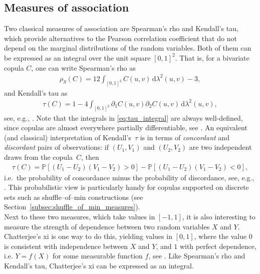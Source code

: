 \documentclass{article}
\theoremstyle{definition}
\newcommand{\Prob}{\mathbb{P}}  %
\newcommand{\de}{\mathrm{\,d}}
\begin{document}
\subsection{Measures of association}
\label{subsec:measures_of_association}

Two classical measures of association are Spearman's rho and Kendall's tau, which provide alternatives to the Pearson correlation coefficient that do not depend on the marginal distributions of the random variables.
Both of them can be expressed as an integral over the unit square $[0,1]^2$.
That is, for a bivariate copula $C$, one can write Spearman's rho as
\begin{align}\label{eq:rho_integral}
    \rho_S(C) = 12 \int_{[0,1]^2} C(u,v) \de \lambda^2(u,v) - 3,
\end{align}
and Kendall's tau as
\begin{align}\label{eq:tau_integral}
    \tau(C) = 1 - 4\int_{[0,1]^2} \partial_1 C(u,v) \partial_2 C(u,v) \de \lambda^2(u,v)
,\end{align}
see, e.g., \cite[Definitions 2.4.5 and 2.4.6]{Durante-2016}.
Note that the integrals in \eqref{eq:tau_integral} are always well-defined, since copulas are almost everywhere partially differentiable, see \cite[Thm.~2.2.7]{Nelsen-2006}.
An equivalent (and classical) interpretation of Kendall’s~$\tau$ is in terms
of \emph{concordant} and \emph{discordant} pairs of observations:
if $(U_1,V_1)$ and $(U_2,V_2)$ are two independent draws from the copula~$C$,
then
\begin{align}\label{eq:tau_concordance}
   \tau(C)
   = \Prob\left[(U_1-U_2)(V_1-V_2)>0\right] - \Prob\left[(U_1-U_2)(V_1-V_2)<0\right],
\end{align}
i.e.\ the probability of concordance minus the probability of discordance, see, e.g., \cite[Section 5.1.1]{Nelsen-2006}.
This probabilistic view is particularly handy for copulas supported on
discrete sets such as shuffle--of--min constructions (see
Section~\ref{subsec:shuffle_of_min_measures}). \\
Next to these two measures, which take values in $[-1,1]$, it is also interesting to measure the strength of dependence between two random variables $X$ and $Y$.
Chatterjee's xi is one way to do this, yielding values in $[0,1]$, where the value $0$ is consistent with independence between $X$ and $Y$, and $1$ with perfect dependence, i.e. $Y = f(X)$ for some measurable function $f$, see \cite[Theorem~2.2]{ansarifuchs2022asimpleextension}.
Like Spearman's rho and Kendall's tau, Chatterjee's xi can be expressed as an integral.
\end{document}
